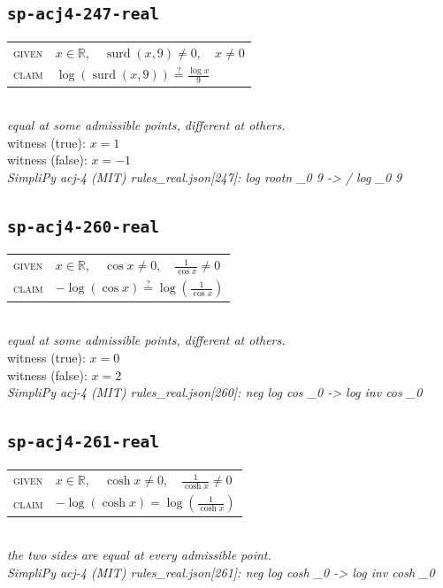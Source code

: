 \documentclass[11pt]{article}
\begin{document}
\subsection*{\texttt{sp-acj4-247-real}}
\begin{tabular}{@{}l@{\quad}l@{}}
\textsc{given} & $x \in \mathbb{R},\quad \operatorname{surd}\left(x, 9\right) \neq 0,\quad x \neq 0$ \\[4pt]
\textsc{claim} & $\displaystyle \log\left(\operatorname{surd}\left(x, 9\right)\right) \overset{?}{=} \frac{\log x}{9}$ \\
\end{tabular}\\[2pt]
{\small\emph{equal at some admissible points, different at others.}}\\
{\footnotesize\color{gray}witness (true): $x = 1$}\\
{\footnotesize\color{gray}witness (false): $x = -1$}\\
\emph{SimpliPy acj-4 (MIT) rules\_real.json[247]: log rootn \_0 9  ->  / log \_0 9}\\

\subsection*{\texttt{sp-acj4-260-real}}
\begin{tabular}{@{}l@{\quad}l@{}}
\textsc{given} & $x \in \mathbb{R},\quad \cos x \neq 0,\quad \frac{1}{\cos x} \neq 0$ \\[4pt]
\textsc{claim} & $\displaystyle -\log\left(\cos x\right) \overset{?}{=} \log\left(\frac{1}{\cos x}\right)$ \\
\end{tabular}\\[2pt]
{\small\emph{equal at some admissible points, different at others.}}\\
{\footnotesize\color{gray}witness (true): $x = 0$}\\
{\footnotesize\color{gray}witness (false): $x = 2$}\\
\emph{SimpliPy acj-4 (MIT) rules\_real.json[260]: neg log cos \_0  ->  log inv cos \_0}\\

\subsection*{\texttt{sp-acj4-261-real}}
\begin{tabular}{@{}l@{\quad}l@{}}
\textsc{given} & $x \in \mathbb{R},\quad \cosh x \neq 0,\quad \frac{1}{\cosh x} \neq 0$ \\[4pt]
\textsc{claim} & $\displaystyle -\log\left(\cosh x\right) = \log\left(\frac{1}{\cosh x}\right)$ \\
\end{tabular}\\[2pt]
{\small\emph{the two sides are equal at every admissible point.}}\\
\emph{SimpliPy acj-4 (MIT) rules\_real.json[261]: neg log cosh \_0  ->  log inv cosh \_0}\\
\end{document}
